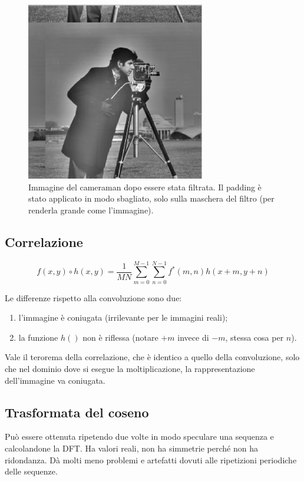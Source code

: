 \documentclass[a4paper,11pt]{article}
\begin{document}
\renewcommand{\thefigure}{6.4}
\begin{figure}[!h]
  \centering
    \includegraphics[scale=0.4]{images/6/cameraman_wrong_padding.png}
    \caption{Immagine del cameraman dopo essere stata filtrata. Il padding è stato applicato in modo sbagliato, solo sulla maschera del filtro (per renderla grande come l'immagine).}
\end{figure}

\subsection{Correlazione}
\[
f(x,y) \circ h(x,y) = \frac{1}{MN} \sum_{m=0}^{M-1} \sum_{n=0}^{N-1}
f^*(m,n)h(x+m,y+n)
\]

Le differenze rispetto alla convoluzione sono due:
\begin{enumerate}
    \item l'immagine è coniugata (irrilevante per le immagini reali);
    \item la funzione $h()$ non è riflessa (notare $+m$ invece di $-m$, stessa cosa per $n$).
\end{enumerate}

Vale il terorema della correlazione, che è identico a quello della convoluzione, solo che nel dominio dove si esegue la moltiplicazione,
la rappresentazione dell'immagine va coniugata.

\subsection{Trasformata del coseno}
Può essere ottenuta ripetendo due volte in modo speculare una sequenza e calcolandone la DFT.
Ha valori reali, non ha simmetrie perché non ha ridondanza. Dà molti meno problemi e artefatti dovuti alle ripetizioni periodiche delle sequenze.
\end{document}
